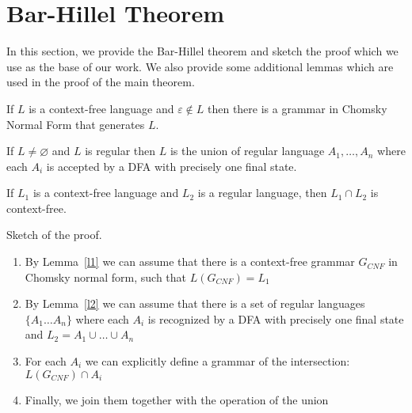\section{Bar-Hillel Theorem}
\label{sec:b-h-th}

In this section, we provide the Bar-Hillel theorem and sketch the proof which we use as the base of our work.
We also provide some additional lemmas which are used in the proof of the main theorem.

\begin{lemma} \label{l1}
	If $L$ is a context-free language and $\varepsilon \notin L$ then there is a grammar in Chomsky Normal Form that generates $L$.
\end{lemma}

\begin{lemma} \label{l2}
	If $ L \neq \varnothing $ and $L$ is regular then $L$ is the union of regular language $A_1, \ldots , A_n$ where each $A_i$ is accepted by a DFA with precisely one final state.
\end{lemma}

\begin{theorem}
	If $L_1$ is a context-free language and $L_2$ is a regular language, then $L_1 \cap L_2$ is context-free.
\end{theorem}


Sketch of the proof.
\begin{enumerate}
	\item By Lemma~\ref{l1} we can assume that there is a context-free grammar $G_{CNF}$ in Chomsky normal form, such that $L(G_{CNF}) = L_1$
	\item By Lemma~\ref{l2} we can assume that there is a set of regular languages $\{A_{1} \ldots A_n \}$ where each $A_i$ is recognized by a DFA with precisely one final state and $L_2 = A_1 \cup \ldots \cup A_n$
	\item For each $A_i$ we can explicitly define a grammar of the intersection: $L( G_{CNF} ) \cap A_i$
	\item Finally, we join them together with the operation of the union
\end{enumerate}
